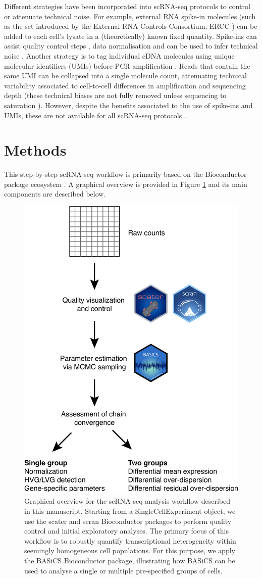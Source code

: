 \documentclass[9pt,a4paper,]{extarticle}
\begin{document}
Different strategies have been incorporated into scRNA-seq protocols to control
or attenuate technical noise.
For example, external RNA spike-in molecules (such as the set introduced by the
External RNA Controls Consortium, ERCC \citep{Rna2005}) can be added to each cell's
lysate in a (theoretically) known fixed quantity.
Spike-ins can assist quality control steps \citep{McCarthy2017}, data normalisation
\citep{Vallejos2017} and can be used to infer technical noise \citep{Brennecke2013}.
Another strategy is to tag individual cDNA molecules using unique molecular
identifiers (UMIs) before PCR amplification \citep{Islam2014}.
Reads that contain the same UMI can be collapsed into a single molecule count,
attenuating technical variability associated to cell-to-cell differences
in amplification and sequencing depth (these technical biases are not fully
removed unless sequencing to saturation \citep{Vallejos2017}).
However, despite the benefits associated to the use of spike-ins and UMIs,
these are not available for all scRNA-seq protocols \citep{Haque2017}.

\hypertarget{methods}{%
\section{Methods}\label{methods}}

This step-by-step scRNA-seq workflow is primarily based on the Bioconductor
package ecosystem \citep{Amezquita2019}.
A graphical overview is provided in Figure \ref{fig:overview}
and its main components are described below.

\begin{figure}[h]

{\centering \includegraphics[width=0.5\linewidth]{figure/Overview} 

}

\caption{Graphical overview for the scRNA-seq analysis workflow described in this manuscript. Starting from a SingleCellExperiment object, we use the scater and scran Bioconductor packages to perform quality control and initial exploratory analyses. The primary focus of this workflow is to robustly quantify transcriptional heterogeneity within seemingly homogeneous cell populations. For this purpose, we apply the BASiCS Bioconductor package, illustrating how BASiCS can be used to analyse a single or multiple pre-specified groups of cells.}\label{fig:overview}
\end{figure}
\end{document}
